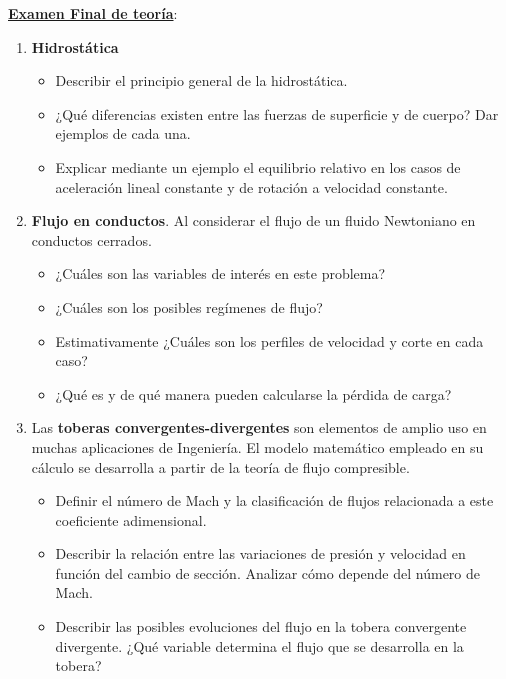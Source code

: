 \documentclass[a4paper,10pt]{article}
\begin{document}

\noindent \underline{\textbf{Examen Final de teoría}}:

\begin{enumerate}
  \item {\bf Hidrostática}
	\begin{itemize} 
	\item Describir el principio general de la hidrostática.
	\item ¿Qué diferencias existen entre las fuerzas de superficie y de cuerpo? Dar ejemplos de cada una.
	\item Explicar mediante un ejemplo el equilibrio relativo en los casos de aceleración lineal constante y
	de rotación a velocidad constante.
	\end{itemize}
	
    \item {\bf Flujo en conductos}. Al considerar el flujo de un fluido Newtoniano en conductos cerrados.
  \begin{itemize}
  \item ¿Cuáles son las variables de interés en este problema?
  \item ¿Cuáles son los posibles regímenes de flujo?
  \item Estimativamente ¿Cuáles son los perfiles de velocidad y corte en cada caso?
  \item ¿Qué es y de qué manera pueden calcularse la pérdida de carga?
  \end{itemize}

    \item Las {\bf toberas convergentes-divergentes} son elementos de amplio uso en muchas aplicaciones de Ingeniería. El modelo matemático       empleado en su cálculo se desarrolla a partir de la teoría de flujo compresible.
    
	\begin{itemize}
	\item Definir el número de Mach y la clasificación de flujos relacionada a este coeficiente adimensional.
	\item Describir la relación entre las variaciones de presión y velocidad en función del cambio de sección.
	Analizar cómo depende del número de Mach.
	\item Describir las posibles evoluciones del flujo en la tobera convergente divergente.
	¿Qué variable determina el flujo que se desarrolla en la tobera?
	\end{itemize}
\end{enumerate}
\end{document}
